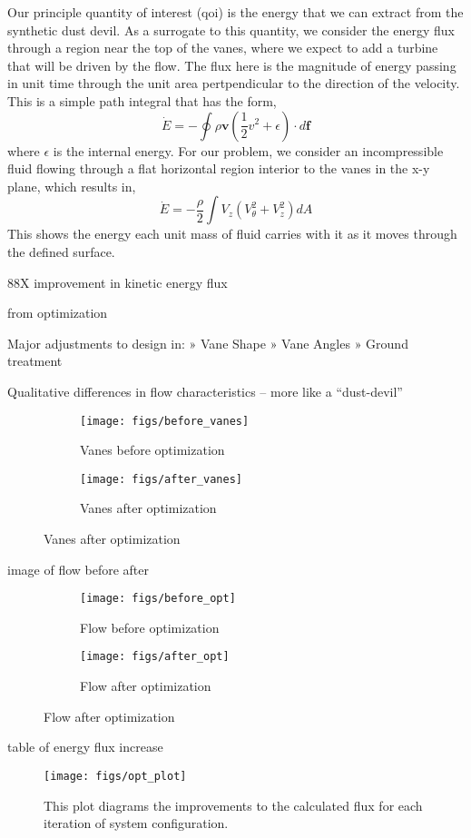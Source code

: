 Our principle quantity of interest (qoi) is the energy that we can
extract from the synthetic dust devil. As a surrogate to this quantity,
we consider the energy flux through a region near the top of the vanes,
where we expect to add a turbine that will be driven by the flow. The
flux here is the magnitude of energy passing in unit time through the
unit area pertpendicular to the direction of the velocity. This is a
simple path integral that has the form\cite{landau1959fm},  
\begin{equation}
 \dot E = -\oint \rho \textbf{v}(\frac{1}{2}v^2 + \epsilon) \cdot d \textbf{f}
\end{equation}
where $\epsilon$ is the internal energy. %
For our problem, we consider an incompressible fluid flowing through a
flat horizontal region interior to the vanes in the x-y plane, which
results in, 
 \begin{equation}
 \dot E = -\frac{\rho }{2} \int V_z (V_{\theta}^2 + V_z^2 ) dA
 \end{equation}
This shows the energy each unit mass of fluid carries with it as it
moves through the defined surface. 


88X improvement in kinetic energy flux

from optimization 

 Major adjustments to design in:
» Vane Shape
» Vane Angles
» Ground treatment

 Qualitative differences in flow 
 characteristics – more like a “dust-devil”

\begin{figure}[htb!]
 \begin{subfigure}{.5\textwidth}
  \centering
  \texttt{[image: figs/before\_vanes]}
  \caption{Vanes before optimization}
  \label{fig:vt-wind-vert}
 \end{subfigure}%
 \begin{subfigure}{.5\textwidth}
  \centering
  \texttt{[image: figs/after\_vanes]}
  \caption{Vanes after optimization}
  \label{fig:vz-wind-vert}
 \end{subfigure}%
\end{figure}


image of flow before after

\begin{figure}[htb!]
 \begin{subfigure}{.5\textwidth}
  \centering
  \texttt{[image: figs/before\_opt]}
  \caption{Flow before optimization}
 \end{subfigure}%
 \begin{subfigure}{.5\textwidth}
  \centering
  \texttt{[image: figs/after\_opt]}
  \caption{Flow after optimization}
 \end{subfigure}%
  \label{fig:opt_flow}
\end{figure}

table of energy flux increase


\begin{figure}[htb]
 \centering
 \texttt{[image: figs/opt\_plot]}
 \caption{This plot diagrams the improvements to the calculated flux for  
 each iteration of system configuration.}
 \label{fig:opt_plot}
\end{figure}
